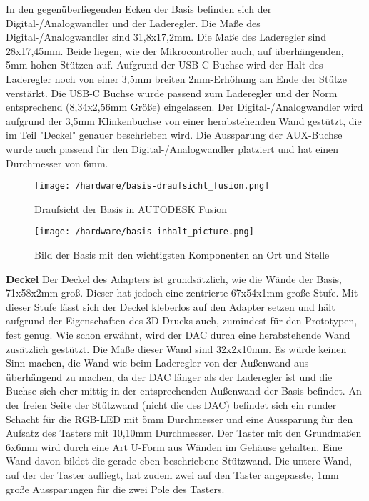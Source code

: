 \documentclass[11pt, twoside]{article}
\begin{document}
In den gegenüberliegenden Ecken der Basis befinden sich der Digital-/Analogwandler und der Laderegler. Die Maße des Digital-/Analogwandler sind 31,8x17,2mm. Die Maße des Laderegler sind 28x17,45mm. Beide liegen, wie der Mikrocontroller auch, auf überhängenden, 5mm hohen Stützen auf. Aufgrund der USB-C Buchse wird der Halt des Laderegler noch von einer 3,5mm breiten 2mm-Erhöhung am Ende der Stütze verstärkt. Die USB-C Buchse wurde passend zum Laderegler und der Norm entsprechend (8,34x2,56mm Größe) eingelassen. Der Digital-/Analogwandler wird aufgrund der 3,5mm Klinkenbuchse von einer herabstehenden Wand gestützt, die im Teil "Deckel" genauer beschrieben wird. Die Aussparung der AUX-Buchse wurde auch passend für den Digital-/Analogwandler platziert und hat einen Durchmesser von 6mm.\newline
\begin{figure}[H]
\begin{flushleft}
\texttt{[image: /hardware/basis-draufsicht\_fusion.png]}
\caption{Draufsicht der Basis in AUTODESK Fusion}
\end{flushleft}
\end{figure}
\begin{figure}[H]
\begin{flushleft}
\texttt{[image: /hardware/basis-inhalt\_picture.png]}
\caption{Bild der Basis mit den wichtigsten Komponenten an Ort und Stelle}
\end{flushleft}
\end{figure}
\vspace{4mm}
\textbf{Deckel} \newline
Der Deckel des Adapters ist grundsätzlich, wie die Wände der Basis, 71x58x2mm groß. Dieser hat jedoch eine zentrierte 67x54x1mm große Stufe. Mit dieser Stufe lässt sich der Deckel kleberlos auf den Adapter setzen und hält aufgrund der Eigenschaften des 3D-Drucks auch, zumindest für den Prototypen, fest genug.
Wie schon erwähnt, wird der DAC durch eine herabstehende Wand zusätzlich gestützt. Die Maße dieser Wand sind 32x2x10mm. Es würde keinen Sinn machen, die Wand wie beim Laderegler von der Außenwand aus überhängend zu machen, da der DAC länger als der Laderegler ist und die Buchse sich eher mittig in der entsprechenden Außenwand der Basis befindet.\newline
An der freien Seite der Stützwand (nicht die des DAC) befindet sich ein runder Schacht für die RGB-LED mit 5mm Durchmesser und eine Aussparung für den Aufsatz des Tasters mit 10,10mm Durchmesser. Der Taster mit den Grundmaßen 6x6mm wird durch eine Art U-Form aus Wänden im Gehäuse gehalten. Eine Wand davon bildet die gerade eben beschriebene Stützwand. Die untere Wand, auf der der Taster aufliegt, hat zudem zwei auf den Taster angepasste, 1mm große Aussparungen für die zwei Pole des Tasters.\newline
\end{document}
